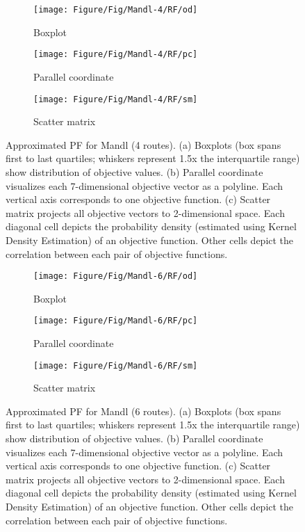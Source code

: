 \begin{figure}[!htbp]
	\centering
	\begin{subfigure}{0.6\textwidth}
		\texttt{[image: Figure/Fig/Mandl-4/RF/od]}
		\caption{Boxplot}
	\end{subfigure}
	\newline
	\begin{subfigure}{0.6\textwidth}
		\texttt{[image: Figure/Fig/Mandl-4/RF/pc]}
		\caption{Parallel coordinate}
	\end{subfigure}
	\newline
	\begin{subfigure}{0.85\textwidth}
		\texttt{[image: Figure/Fig/Mandl-4/RF/sm]}
		\caption{Scatter matrix}
	\end{subfigure}
	\caption{Approximated PF for Mandl (4 routes). (a) Boxplots (box spans first to last quartiles; whiskers represent 1.5x the interquartile range) show distribution of objective values. (b) Parallel coordinate visualizes each 7-dimensional objective vector as a polyline. Each vertical axis corresponds to one objective function. (c) Scatter matrix projects all objective vectors to 2-dimensional space. Each diagonal cell depicts the probability density (estimated using Kernel Density Estimation) of an objective function. Other cells depict the correlation between each pair of objective functions.}
	\label{fig:apf_mandl4}
\end{figure}
\begin{figure}[!htbp]
	\centering
	\begin{subfigure}{0.6\textwidth}
		\texttt{[image: Figure/Fig/Mandl-6/RF/od]}
		\caption{Boxplot}
	\end{subfigure}
	\newline
	\begin{subfigure}{0.6\textwidth}
		\texttt{[image: Figure/Fig/Mandl-6/RF/pc]}
		\caption{Parallel coordinate}
	\end{subfigure}
	\newline
	\begin{subfigure}{0.85\textwidth}
		\texttt{[image: Figure/Fig/Mandl-6/RF/sm]}
		\caption{Scatter matrix}
	\end{subfigure}
	\caption{Approximated PF for Mandl (6 routes). (a) Boxplots (box spans first to last quartiles; whiskers represent 1.5x the interquartile range) show distribution of objective values. (b) Parallel coordinate visualizes each 7-dimensional objective vector as a polyline. Each vertical axis corresponds to one objective function. (c) Scatter matrix projects all objective vectors to 2-dimensional space. Each diagonal cell depicts the probability density (estimated using Kernel Density Estimation) of an objective function. Other cells depict the correlation between each pair of objective functions.}
	\label{fig:apf_mandl6}
\end{figure}
